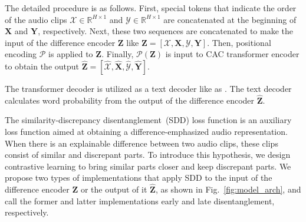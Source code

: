 The detailed procedure is as follows.
First, special tokens that indicate the order of the audio clips $\mathcal{X} \in \mathbb{R}^{H \times 1}$ and $\mathcal{Y} \in \mathbb{R}^{H \times 1}$ are concatenated at the beginning of $\boldsymbol{X}$ and $\boldsymbol{Y}$, respectively.
Next, these two sequences are concatenated to make the input of the difference encoder $\boldsymbol{Z}$ like $\boldsymbol{Z} = [\mathcal{X}, \boldsymbol{X}, \mathcal{Y}, \boldsymbol{Y}]$.
Then, positional encoding $\mathscr{P}$ is applied to $\boldsymbol{Z}$.
Finally, $\mathscr{P}(\boldsymbol{Z})$ is input to CAC transformer encoder to obtain the output $\boldsymbol{\hat{Z}}= [\hat{\mathcal{X}}, \boldsymbol{\hat{X}}, \hat{\mathcal{Y}}, \boldsymbol{\hat{Y}}]$.

The transformer decoder is utilized as a text decoder like as \cite{mei2021audio}.
The text decoder calculates word probability from the output of the difference encoder $\boldsymbol{\hat{Z}}$.

The similarity-discrepancy disentanglement~(SDD) loss function is an auxiliary loss function aimed at obtaining a difference-emphasized audio representation.
When there is an explainable difference between two audio clips, these clips consist of similar and discrepant parts.
To introduce this hypothesis, we design contrastive learning to bring similar parts closer and keep discrepant parts.
We propose two types of implementations that apply SDD to the input of the difference encoder $\boldsymbol{Z}$ or the output of it $\boldsymbol{\hat{Z}}$, as shown in Fig.~\ref{fig:model_arch}, and call the former and latter implementations early and late disentanglement, respectively.

